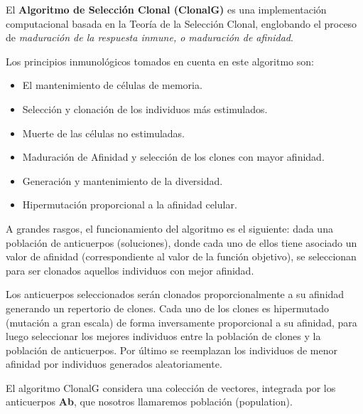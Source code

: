 \documentclass[10pt,a4paper]{article}
\begin{document}
	El \textbf{Algoritmo de Selección Clonal (ClonalG)} es una implementación computacional
	basada en la Teoría de la Selección Clonal, englobando el proceso de \textit{maduración de
	la respuesta inmune, o maduración de afinidad}. 

	Los principios inmunológicos tomados en cuenta en este algoritmo son:	
	\begin{itemize}
		\item El mantenimiento de células de memoria.
		\item Selección y clonación de los individuos más estimulados.
		\item Muerte de las células no estimuladas.
		\item Maduración de Afinidad y selección de los clones con mayor afinidad.
		\item Generación y mantenimiento de la diversidad.
		\item Hipermutación proporcional a la afinidad celular.
	\end{itemize}	
	A grandes rasgos, el funcionamiento del algoritmo es el siguiente: dada una
	población de anticuerpos (soluciones), donde cada uno de ellos tiene asociado un valor de afinidad
	(correspondiente al valor de la función objetivo), se seleccionan para ser clonados aquellos
	individuos con mejor afinidad.
	
	Los anticuerpos seleccionados serán clonados proporcionalmente a su afinidad generando un
	repertorio de clones. Cada uno de los clones es hipermutado (mutación a gran escala) de forma
	inversamente proporcional a su afinidad, para luego seleccionar los mejores individuos entre la
	población de clones y la población de anticuerpos. Por último se reemplazan los individuos de
	menor afinidad por individuos generados aleatoriamente.
	
	El algoritmo ClonalG considera una colección de vectores, integrada por los anticuerpos \textbf{Ab}, que nosotros llamaremos población (population). 
	
\end{document}
